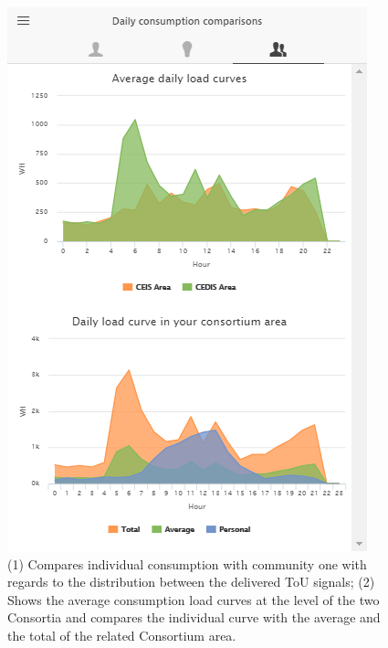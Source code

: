 \begin{figure}[htb]
\begin{center}
\begin{minipage}[htb]{0.45\linewidth}
         \includegraphics[width=1\linewidth]{img/benchmark.png}
        \end{minipage}
      \end{center}
      \caption{(1) Compares individual consumption with community one with regards to the distribution between the delivered ToU signals; (2) Shows the average consumption load curves at the level of the two Consortia and compares the individual curve with the average and the total of the related Consortium area.
}
\label{fig:comparison}
\end{figure}

